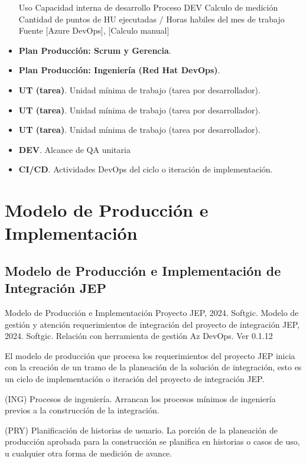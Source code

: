 \documentclass[
  paper=a4,
  ,captions=tableheading
]{scrartcl}
\renewenvironment{quote}{\begin{customblockquote}\list{}{\rightmargin=0em\leftmargin=0em}%
\item\relax\color{blockquote-text}\ignorespaces}{\unskip\unskip\endlist\end{customblockquote}}
\begin{document}
\begin{itemize}
  Uso Capacidad interna de desarrollo Proceso DEV Calculo de medición
  Cantidad de puntos de HU ejecutadas / Horas habiles del mes de trabajo
  Fuente {[}Azure DevOps{]}, {[}Calculo manual{]}
\item
  \textbf{Plan Producción: Scrum y Gerencia}.
\item
  \textbf{Plan Producción: Ingeniería (Red Hat DevOps)}.
\item
  \textbf{UT (tarea)}. Unidad mínima de trabajo (tarea por
  desarrollador).
\item
  \textbf{UT (tarea)}. Unidad mínima de trabajo (tarea por
  desarrollador).
\item
  \textbf{UT (tarea)}. Unidad mínima de trabajo (tarea por
  desarrollador).
\item
  \textbf{DEV}. Alcance de QA unitaria
\item
  \textbf{CI/CD}. Actividades DevOps del ciclo o iteración de
  implementación.
\end{itemize}

\newpage

\section{Modelo de Producción e
Implementación}\label{sec:modelo-de-producciuxf3n-e-implementaciuxf3n}

\subsection{Modelo de Producción e Implementación de Integración
JEP}\label{sec:modelo-de-producciuxf3n-e-implementaciuxf3n-de-integraciuxf3n-jep}

\begin{quote}
Modelo de Producción e Implementación Proyecto JEP, 2024. Softgic.
Modelo de gestión y atención requerimientos de integración del proyecto
de integración JEP, 2024. Softgic. Relación con herramienta de gestión
Az DevOps. Ver 0.1.12
\end{quote}

El modelo de producción que procesa los requerimientos del proyecto JEP
inicia con la creación de un tramo de la planeación de la solución de
integración, esto es un ciclo de implementación o iteración del proyecto
de integración JEP.

(ING) Procesos de ingeniería. Arrancan los procesos mínimos de
ingeniería previos a la construcción de la integración.

(PRY) Planificación de historias de usuario. La porción de la planeación
de producción aprobada para la construcción se planifica en historias o
casos de uso, u cualquier otra forma de medición de avance.
\end{document}
